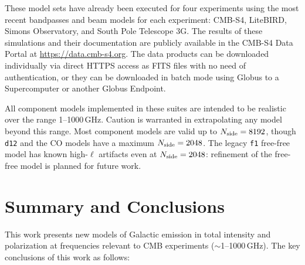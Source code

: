\documentclass[twocolumn]{aastex631}
\begin{document}
These model sets have already been executed for four experiments using the most recent bandpasses and beam models for each experiment: CMB-S4, LiteBIRD, Simons Observatory, and South Pole Telescope 3G. The results of these simulations and their documentation are publicly available in the CMB-S4 Data Portal at \url{https://data.cmb-s4.org}. The data products can be downloaded individually via direct HTTPS access as FITS files with no need of authentication, or they can be downloaded in batch mode using Globus to a Supercomputer or another Globus Endpoint.

All component models implemented in these suites are intended to be realistic over the range 1--1000\,GHz. Caution is warranted in extrapolating any model beyond this range. Most component models are valid up to $N_{\rm side}=8192$, though \texttt{d12} and the CO models have a maximum $N_{\rm side}=2048$. The legacy \texttt{f1} free-free model has known high-$\ell$ artifacts even at $N_{\rm side} = 2048$: refinement of the free-free model is planned for future work.

\section{Summary and Conclusions} \label{sec:summary}

This work presents new models of Galactic emission in total intensity and polarization at frequencies relevant to CMB experiments ($\sim$1--1000\,GHz). The key conclusions of this work as follows:

\end{document}
